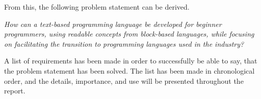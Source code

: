From this, the following problem statement can be derived.

\begin{center}
    \textit{How can a text-based programming language be developed for beginner programmers, using readable concepts from block-based languages, while focusing on facilitating the transition to programming languages used in the industry?}
\end{center}

A list of requirements has been made in order to successfully be able to say, that the problem statement has been solved. The list has been made in chronological order, and the details, importance, and use will be presented throughout the report.


